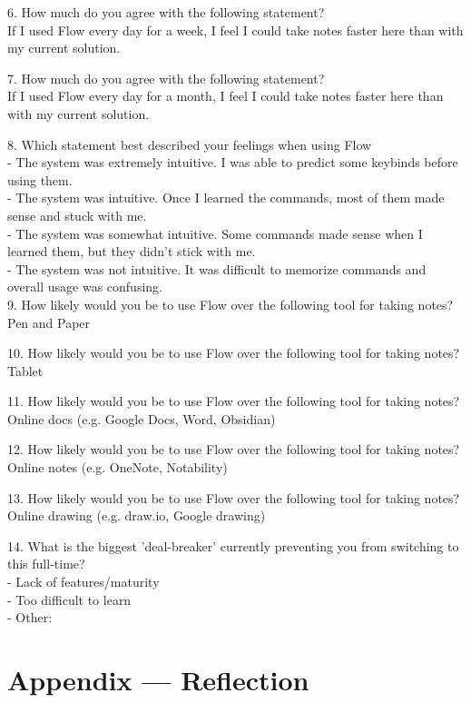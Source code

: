 \documentclass[12pt, titlepage]{article}
\begin{document}
6. How much do you agree with the following statement? \\
If I used Flow every day for a week, I feel I could take notes faster here than with my current solution.

7. How much do you agree with the following statement? \\
If I used Flow every day for a month, I feel I could take notes faster here than with my current solution.

8. Which statement best described your feelings when using Flow \\
- The system was extremely intuitive. I was able to predict some keybinds before using them. \\
- The system was intuitive. Once I learned the commands, most of them made sense and stuck with me. \\
- The system was somewhat intuitive. Some commands made sense when I learned them, but they didn't stick with me. \\
- The system was not intuitive. It was difficult to memorize commands and overall usage was confusing. \\

9. How likely would you be to use Flow over the following tool for taking notes? \\
Pen and Paper

10. How likely would you be to use Flow over the following tool for taking notes? \\
Tablet

11. How likely would you be to use Flow over the following tool for taking notes? \\
Online docs (e.g. Google Docs, Word, Obsidian)

12. How likely would you be to use Flow over the following tool for taking notes? \\
Online notes (e.g. OneNote, Notability)

13. How likely would you be to use Flow over the following tool for taking notes? \\
Online drawing (e.g. draw.io, Google drawing)

14. What is the biggest 'deal-breaker' currently preventing you from switching to this full-time? \\
- Lack of features/maturity \\
- Too difficult to learn \\
- Other:  \\

\newpage{}
\section*{Appendix --- Reflection}
\end{document}
